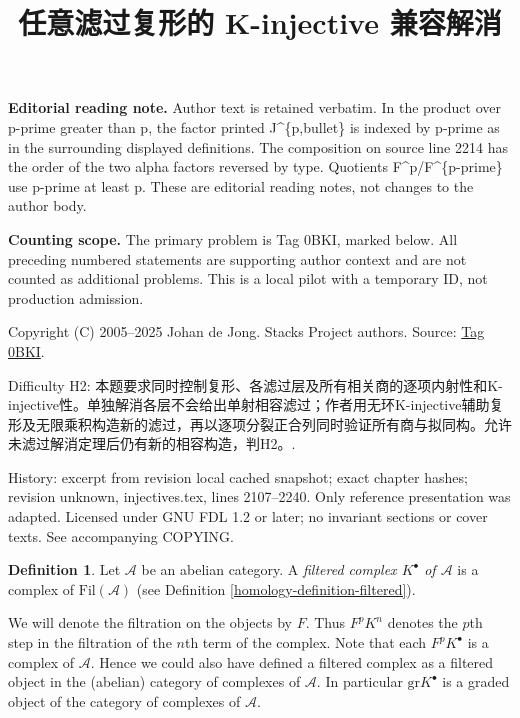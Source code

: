 \documentclass{amsart}
\theoremstyle{plain}
\theoremstyle{definition}
\newtheorem{definition}[subsection]{Definition}
\theoremstyle{remark}
\numberwithin{equation}{subsection}
\begin{document}
\title[Stacks Project, Tag 0BKI]{任意滤过复形的 K-injective 兼容解消}
\maketitle
\noindent\textbf{Editorial reading note.} Author text is retained verbatim. In the product over p-prime greater than p, the factor printed J\textasciicircum{}\{p,bullet\} is indexed by p-prime as in the surrounding displayed definitions. The composition on source line 2214 has the order of the two alpha factors reversed by type. Quotients F\textasciicircum{}p/F\textasciicircum{}\{p-prime\} use p-prime at least p. These are editorial reading notes, not changes to the author body.


\noindent\textbf{Counting scope.} The primary problem is Tag 0BKI, marked below. All preceding numbered statements are supporting author context and are not counted as additional problems. This is a local pilot with a temporary ID, not production admission.


\noindent Copyright (C) 2005--2025 Johan de Jong. Stacks Project authors. Source: \href{https://stacks.math.columbia.edu/tag/0BKI}{Tag 0BKI}.

\noindent Difficulty H2: 本题要求同时控制复形、各滤过层及所有相关商的逐项内射性和K-injective性。单独解消各层不会给出单射相容滤过；作者用无环K-injective辅助复形及无限乘积构造新的滤过，再以逐项分裂正合列同时验证所有商与拟同构。允许未滤过解消定理后仍有新的相容构造，判H2。.

\noindent History: excerpt from revision local cached snapshot; exact chapter hashes; revision unknown, injectives.tex, lines 2107--2240. Only reference presentation was adapted. Licensed under GNU FDL 1.2 or later; no invariant sections or cover texts. See accompanying COPYING.

\begin{definition}
\label{homology-definition-filtered-complex}
Let $\mathcal{A}$ be an abelian category.
A {\it filtered complex $K^\bullet$ of $\mathcal{A}$}
is a complex of $\text{Fil}(\mathcal{A})$ (see
Definition \ref{homology-definition-filtered}).
\end{definition}

\noindent
We will denote the filtration on the objects by $F$. Thus
$F^pK^n$ denotes the $p$th step in the filtration of the $n$th term of the
complex. Note that each $F^pK^\bullet$ is a complex of $\mathcal{A}$.
Hence we could also have defined a filtered complex as a filtered object
in the (abelian) category of complexes of $\mathcal{A}$.
In particular $\text{gr} K^\bullet$ is a graded object of the
category of complexes of $\mathcal{A}$.
\end{document}
